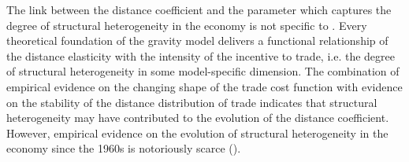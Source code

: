 \documentclass[12pt,twoside,a4paper,notitlepage]{article}
\begin{document}

The link between the distance coefficient and the parameter which captures the degree of structural heterogeneity in the economy is not specific to \cite{ChaneyThomas2018}.
Every theoretical foundation of the gravity model delivers a functional relationship of the distance elasticity with the intensity of the incentive to trade, 
i.e. the degree of structural heterogeneity in some model-specific dimension.
The combination of empirical evidence on the changing shape of the trade cost function with evidence on the stability of the distance distribution of trade indicates that structural heterogeneity may have contributed to the evolution of the distance coefficient.
However, empirical evidence on the evolution of structural heterogeneity in the economy since the 1960s is notoriously scarce (\cite{Head2013}).
\end{document}
